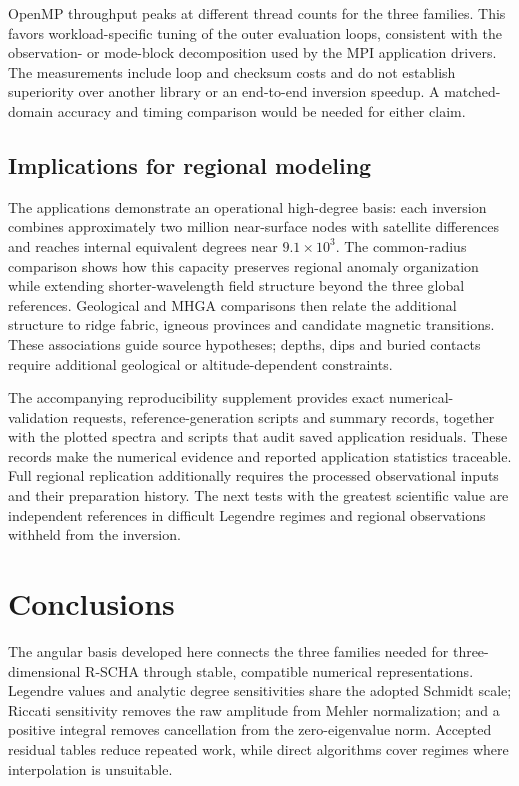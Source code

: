 ﻿\documentclass[11pt,a4paper]{article}
\newcommand{\RSCHA}{\textsc{R-SCHA}\xspace}
\begin{document}
OpenMP throughput peaks at different thread counts for the three families. This favors workload-specific tuning of the outer evaluation loops, consistent with the observation- or mode-block decomposition used by the MPI application drivers. The measurements include loop and checksum costs and do not establish superiority over another library or an end-to-end inversion speedup. A matched-domain accuracy and timing comparison would be needed for either claim.

\subsection{Implications for regional modeling}

The applications demonstrate an operational high-degree basis: each inversion combines approximately two million near-surface nodes with satellite differences and reaches internal equivalent degrees near $9.1\times10^3$. The common-radius comparison shows how this capacity preserves regional anomaly organization while extending shorter-wavelength field structure beyond the three global references. Geological and MHGA comparisons then relate the additional structure to ridge fabric, igneous provinces and candidate magnetic transitions. These associations guide source hypotheses; depths, dips and buried contacts require additional geological or altitude-dependent constraints.

The accompanying reproducibility supplement provides exact numerical-validation requests, reference-generation scripts and summary records, together with the plotted spectra and scripts that audit saved application residuals. These records make the numerical evidence and reported application statistics traceable. Full regional replication additionally requires the processed observational inputs and their preparation history. The next tests with the greatest scientific value are independent references in difficult Legendre regimes and regional observations withheld from the inversion.

\section{Conclusions}

The angular basis developed here connects the three families needed for three-dimensional \RSCHA through stable, compatible numerical representations. Legendre values and analytic degree sensitivities share the adopted Schmidt scale; Riccati sensitivity removes the raw amplitude from Mehler normalization; and a positive integral removes cancellation from the zero-eigenvalue norm. Accepted residual tables reduce repeated work, while direct algorithms cover regimes where interpolation is unsuitable.
\end{document}
